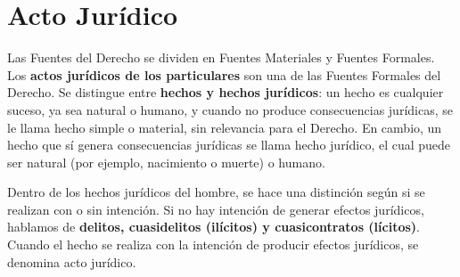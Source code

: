\documentclass{templateNote}
\begin{document}


\section{Acto Jurídico}
Las Fuentes del Derecho se dividen en Fuentes Materiales y Fuentes Formales. Los \textbf{actos jurídicos de los particulares} son una de las Fuentes Formales del Derecho. Se distingue entre \textbf{hechos y hechos jurídicos}: un hecho es cualquier suceso, ya sea natural o humano, y cuando no produce consecuencias jurídicas, se le llama hecho simple o material, sin relevancia para el Derecho. En cambio, un hecho que sí genera consecuencias jurídicas se llama hecho jurídico, el cual puede ser natural (por ejemplo, nacimiento o muerte) o humano.

Dentro de los hechos jurídicos del hombre, se hace una distinción según si se realizan con o sin intención. Si no hay intención de generar efectos jurídicos, hablamos de \textbf{delitos, cuasidelitos (ilícitos) y cuasicontratos (lícitos)}. Cuando el hecho se realiza con la intención de producir efectos jurídicos, se denomina acto jurídico.
\end{document}
